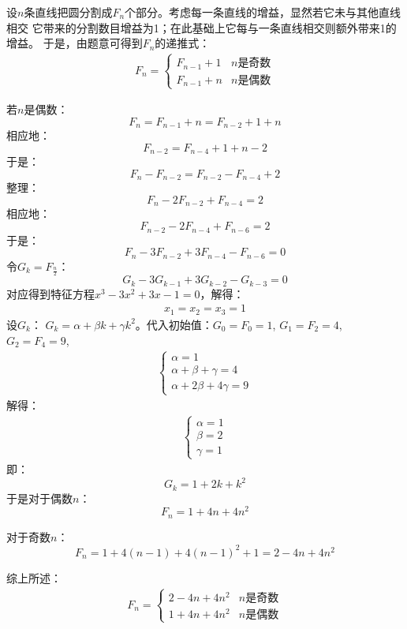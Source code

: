 \begin{solution}
    设$n$条直线把圆分割成$F_n$个部分。考虑每一条直线的增益，显然若它未与其他直线相交
    它带来的分割数目增益为1；在此基础上它每与一条直线相交则额外带来1的增益。
    于是，由题意可得到$F_n$的递推式：
    \begin{align*}
        F_n = 
        \begin{cases}
        F_{n-1}+1&n\text{是奇数}\\
        F_{n-1}+n&n\text{是偶数}
        \end{cases}
    \end{align*}

    若$n$是偶数：
    $$F_n=F_{n-1}+n=F_{n-2}+1+n$$
    相应地：
    $$F_{n-2}=F_{n-4}+1+n-2$$
    于是：
    $$F_n-F_{n-2}=F_{n-2}-F_{n-4}+2$$
    整理：
    $$F_n-2F_{n-2}+F_{n-4}=2$$
    相应地：
    $$F_{n-2}-2F_{n-4}+F_{n-6}=2$$
    于是：
    $$F_n-3F_{n-2}+3F_{n-4}-F_{n-6}=0$$
    令$G_k=F_\frac{n}{2}$：
    $$G_k-3G_{k-1}+3G_{k-2}-G_{k-3}=0$$
    对应得到特征方程$x^3-3x^2+3x-1=0$，解得：
    \begin{align*}
            x_1 = x_2 = x_3 = 1
    \end{align*}
    设$G_k$：
    $G_k = \alpha+ \beta k+\gamma k^2$。代入初始值：$G_0=F_0=1$, $G_1=F_2=4$,
    $G_2=F_4=9$,  
    \begin{align*}
        \begin{cases}
            \alpha = 1\\
            \alpha+ \beta + \gamma = 4\\
            \alpha+ 2\beta +4\gamma = 9
        \end{cases}
    \end{align*}
    解得：
    \begin{align*}
        \begin{cases}
            \alpha = 1\\
            \beta =2\\
            \gamma = 1
        \end{cases}
    \end{align*}
    即：
    $$G_k = 1 + 2k+ k^2$$
    于是对于偶数$n$：
    $$F_n = 1 + 4n+ 4n^2$$

    对于奇数$n$：
    $$F_n = 1 + 4(n-1)+ 4(n-1)^2+1=2-4n+4n^2$$

    综上所述：
    \begin{align*}
        F_n = 
        \begin{cases}
            2-4n+4n^2&n\text{是奇数}\\
            1 + 4n+ 4n^2&n\text{是偶数}
        \end{cases}
    \end{align*}
\end{solution}